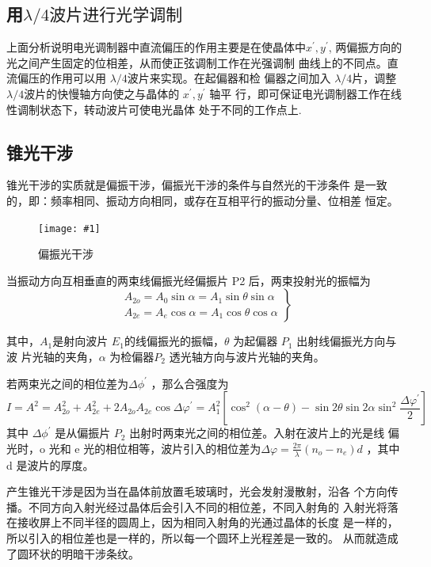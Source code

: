 \documentclass[UTF8]{ctexart}
\newcommand{\singlefig}[4]{
	\begin{figure}[!h]
		\centering
		\texttt{[image: \#1]}
		\caption{#2}
		\label{#3}
	\end{figure}
}
\begin{document}
\subsection{用$\lambda/4波片进行光学调制$}
上面分析说明电光调制器中直流偏压的作用主要是在使晶体中$ x^{'}, y^{'}$,
两偏振方向的光之间产生固定的位相差，从而使正弦调制工作在光强调制
曲线上的不同点。直流偏压的作用可以用 $\lambda/4$波片来实现。在起偏器和检
偏器之间加入 $\lambda/4$片，调整 $\lambda/4$波片的快慢轴方向使之与晶体的 $ x^{'}, y^{'}$ 轴平
行，即可保证电光调制器工作在线性调制状态下，转动波片可使电光晶体
处于不同的工作点上.
\subsection{锥光干涉}
锥光干涉的实质就是偏振干涉，偏振光干涉的条件与自然光的干涉条件
是一致的，即：频率相同、振动方向相同，或存在互相平行的振动分量、位相差
恒定。
\singlefig{page7-99}{偏振光干涉}{}{0.4}
当振动方向互相垂直的两束线偏振光经偏振片 P2 后，两束投射光的振幅为
\begin{equation}
	\left.\begin{array}{l}
	A_{2 o}=A_{0} \sin \alpha=A_{1} \sin \theta \sin \alpha \\
	A_{2 e}=A_{e} \cos \alpha=A_{1} \cos \theta \cos \alpha
	\end{array}\right\}
\end{equation}

其中，$A_{1}$是射向波片 $E_{1}$的线偏振光的振幅，$\theta$ 为起偏器 $P_{1}$ 出射线偏振光方向与波
片光轴的夹角，$\alpha$ 为检偏器$P_{2}$ 透光轴方向与波片光轴的夹角。

若两束光之间的相位差为$\Delta \phi^{'}$ ，那么合强度为
\begin{equation}
	I=A^{2}=A_{2 o}^{2}+A_{2 e}^{2}+2 A_{2 o} A_{2 e} \cos \Delta \varphi^{\prime}=A_{1}^{2}\left[\cos ^{2}(\alpha-\theta)-\sin 2 \theta \sin 2 \alpha \sin ^{2} \frac{\Delta \varphi^{\prime}}{2}\right]
	\end{equation}
	其中 $\Delta \phi^{'}$ 是从偏振片 $P_{2}$ 出射时两束光之间的相位差。入射在波片上的光是线
	偏光时，o 光和 e 光的相位相等，波片引入的相位差为$\Delta \varphi=\frac{2 \pi}{\lambda}\left(n_{o}-n_{e}\right) d$
	，其中d 是波片的厚度。

	产生锥光干涉是因为当在晶体前放置毛玻璃时，光会发射漫散射，沿各
	个方向传播。不同方向入射光经过晶体后会引入不同的相位差，不同入射角的
	入射光将落在接收屏上不同半径的圆周上，因为相同入射角的光通过晶体的长度
	是一样的，所以引入的相位差也是一样的，所以每一个圆环上光程差是一致的。
	从而就造成了圆环状的明暗干涉条纹。
\end{document}
